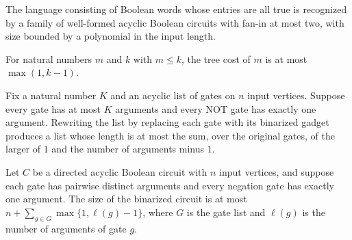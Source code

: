 \begin{theorem}
\label{Language.allOnes_inPPoly}
\leanok
{}
The language consisting of Boolean words whose entries are all true is recognized by a
family of well-formed acyclic Boolean circuits with fan-in at most two, with size
bounded by a polynomial in the input length.
\end{theorem}

\begin{theorem}
\label{BoolCircuit.treeCost_le_max}
\leanok
{}
For natural numbers $m$ and $k$ with $m\le k$, the tree cost of $m$ is at most
$\max(1,k-1)$.
\end{theorem}

\begin{theorem}
\label{BoolCircuit.rewriteGates_binarize_length_le}
\leanok
{}
Fix a natural number $K$ and an acyclic list of gates on $n$ input vertices. Suppose
every gate has at most $K$ arguments and every NOT gate has exactly one argument.
Rewriting the list by replacing each gate with its binarized gadget produces a list
whose length is at most the sum, over the original gates, of the larger of $1$ and the
number of arguments minus $1$.
\end{theorem}

\begin{theorem}
\label{BoolCircuit.DAGCircuit.binarize_size_le_sum}
\leanok
{}
Let $C$ be a directed acyclic Boolean circuit with $n$ input vertices, and suppose each
gate has pairwise distinct arguments and every negation gate has exactly one argument.
The size of the binarized circuit is at most $n+\sum_{g\in G}\max\{1,\ell(g)-1\}$, where
$G$ is the gate list and $\ell(g)$ is the number of arguments of gate $g$.
\end{theorem}

